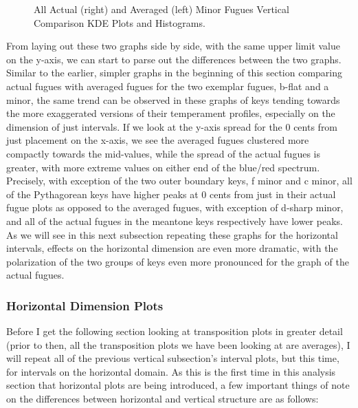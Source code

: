 \begin{figure}[H]
\vspace{1.5em}
    \centering
    \caption[Actual and Averaged Minor Fugues Vertical Comparison KDE Plots and Histograms. ]{All Actual (right) and Averaged (left) Minor Fugues Vertical Comparison KDE Plots and Histograms.}
\end{figure}    From laying out these two graphs side by side, with the same upper limit
value on the y-axis, we can start to parse out the differences between
the two graphs. Similar to the earlier, simpler graphs in the beginning
of this section comparing actual fugues with averaged fugues for the two
exemplar fugues, b-flat and a minor, the same trend can be observed in
these graphs of keys tending towards the more exaggerated versions of
their temperament profiles, especially on the dimension of just
intervals. If we look at the y-axis spread for the 0 cents from just
placement on the x-axis, we see the averaged fugues clustered more
compactly towards the mid-values, while the spread of the actual fugues
is greater, with more extreme values on either end of the blue/red
spectrum. Precisely, with exception of the two outer boundary keys, f
minor and c minor, all of the Pythagorean keys have higher peaks at 0
cents from just in their actual fugue plots as opposed to the averaged
fugues, with exception of d-sharp minor, and all of the actual fugues in
the meantone keys respectively have lower peaks. As we will see in this
next subsection repeating these graphs for the horizontal intervals,
effects on the horizontal dimension are even more dramatic, with the
polarization of the two groups of keys even more pronounced for the
graph of the actual fugues.

    \subsubsection{Horizontal Dimension
Plots}\label{horizontal-dimension-plots}

Before I get the following section looking at transposition plots in
greater detail (prior to then, all the transposition plots we have been
looking at are averages), I will repeat all of the previous vertical
subsection's interval plots, but this time, for intervals on the
horizontal domain. As this is the first time in this analysis section
that horizontal plots are being introduced, a few important things of
note on the differences between horizontal and vertical structure are as
follows:

